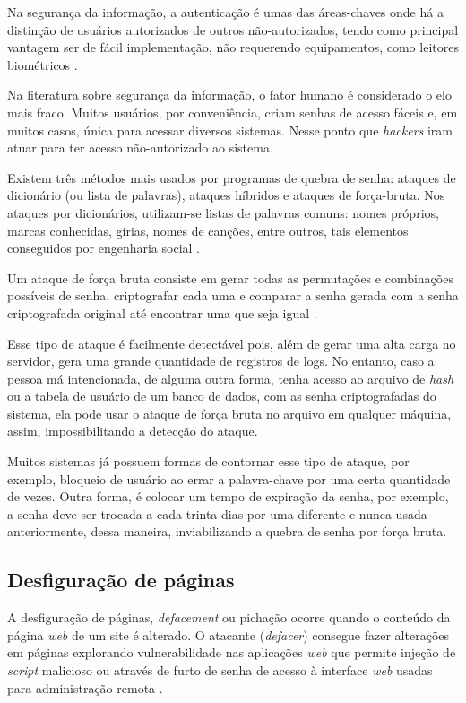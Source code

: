 Na segurança da informação, a autenticação é umas das áreas-chaves onde há a distinção de usuários autorizados de outros não-autorizados, tendo como principal vantagem ser de fácil implementação, não requerendo equipamentos, como leitores biométricos \cite{denise-lilian}.

Na literatura sobre segurança da informação, o fator humano é considerado o elo mais fraco. Muitos usuários, por conveniência, criam senhas de acesso fáceis e, em muitos casos, única para acessar diversos sistemas. Nesse ponto que \textit{hackers} iram atuar para ter acesso não-autorizado ao sistema. 

Existem três métodos mais usados por programas de quebra de senha: ataques de dicionário (ou lista de palavras), ataques híbridos e ataques de força-bruta. Nos ataques por dicionários, utilizam-se listas de palavras comuns: nomes próprios, marcas conhecidas, gírias, nomes de canções, entre outros, tais elementos conseguidos por engenharia social \cite{univhacker}. 

 Um ataque de força bruta consiste em gerar todas as permutações e combinações possíveis de senha, criptografar cada uma e comparar a senha gerada com a senha criptografada original até encontrar uma que seja igual \cite{md5crack2012}. 

 Esse tipo de ataque é facilmente detectável pois, além de gerar uma alta carga no servidor, gera uma grande quantidade de registros de logs. No entanto, caso a pessoa má intencionada, de alguma outra forma, tenha acesso ao arquivo de \textit{hash} ou a tabela de usuário de um banco de dados, com as senha criptografadas do sistema, ela pode usar o ataque de força bruta no arquivo em qualquer máquina, assim, impossibilitando a detecção do ataque.

 Muitos sistemas já possuem formas de contornar esse tipo de ataque, por exemplo, bloqueio de usuário ao errar a palavra-chave por uma certa quantidade de vezes. Outra forma, é colocar um tempo de expiração da senha, por exemplo, a senha deve ser trocada a cada trinta dias por uma diferente e nunca usada anteriormente, dessa maneira, inviabilizando a quebra de senha por força bruta. 

 \subsection{Desfiguração de páginas} \label{sec:desfiguração}

 A desfiguração de páginas, \textit{defacement} ou pichação ocorre quando o conteúdo da página \textit{web} de um site é alterado. O atacante (\textit{defacer}) consegue fazer alterações em páginas explorando vulnerabilidade nas aplicações \textit{web} que permite injeção de \textit{script} malicioso ou através de furto de senha de acesso à interface \textit{web} usadas para administração remota \cite{certs-ataques}.

